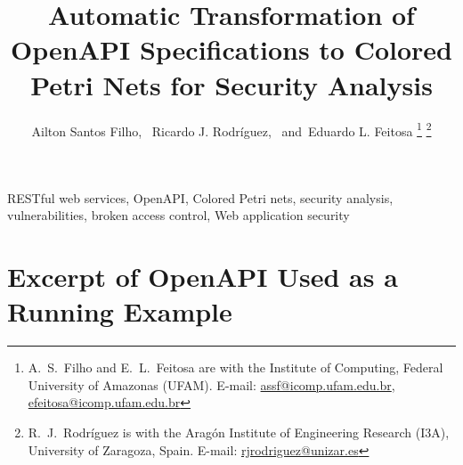 \documentclass[11pt,journal,draftcls,onecolumn]{IEEEtran}
\makeatletter
\def\markboth#1#2{\def\leftmark{\@IEEEcompsoconly{\sffamily}\MakeUppercase{\protect#1}}%
\def\rightmark{\@IEEEcompsoconly{\sffamily}\MakeUppercase{\protect#2}}}
\newcommand{\secondAuthor}{Ricardo J. Rodr\'{i}guez}
\newcommand{\secondAuthorShort}{R.~J.~Rodr\'{i}guez}
\newcommand{\mailRJ}{rjrodriguez@unizar.es}
\newcommand{\IIIA}{Aragón Institute of Engineering Research (I3A)}
\newcommand{\UZ}{University of Zaragoza, Spain}
\newcommand{\mailTo}[1]{\url{#1}}
\newcommand{\firstAuthor}{Ailton Santos Filho}
\newcommand{\firstAuthorShort}{A.~S.~Filho}
\newcommand{\thirdAuthor}{Eduardo L. Feitosa}
\newcommand{\thirdAuthorShort}{E.~L.~Feitosa}
\newcommand{\mailAilton}{assf@icomp.ufam.edu.br}
\newcommand{\mailEduardo}{efeitosa@icomp.ufam.edu.br}
\newcommand{\paperTitle}{Automatic Transformation of OpenAPI Specifications to Colored Petri Nets for Security Analysis}
\newcommand{\keywordsList}{RESTful web services, OpenAPI, Colored Petri nets, security analysis, vulnerabilities, broken access control, Web application security}
\newcommand{\ackText}{The research of Ricardo J. Rodríguez was supported by the grant TED2021-131115A-I00 funded by MCIN/AEI/ 10.13039/501100011033 and by European Union NextGenerationEU/PRTR, and by the University, Industry and Innovation Department of the Aragonese Government under {\em Programa de Proyectos Estratégicos de Grupos de Investigación} (DisCo research group, ref. T21-20R).}
\makeatother
\begin{document}
\title{\paperTitle}

\author{\firstAuthor, %
~\secondAuthor,%
~and~\thirdAuthor
\thanks{{\firstAuthorShort} and {\thirdAuthorShort} are with the Institute of Computing, Federal University of Amazonas (UFAM). E-mail: {\mailTo{\mailAilton}, \mailTo{\mailEduardo}}}
\thanks{{\secondAuthorShort} is with the {\IIIA}, {\UZ}. E-mail:
{\mailTo{\mailRJ}}}%
}


\markboth{Submitted to IEEE Transactions on Systems, Man, and Cybernetics:
Systems}{}

\maketitle







\begin{IEEEkeywords}
\keywordsList
\end{IEEEkeywords}

\IEEEpeerreviewmaketitle













%



\appendix

\section{Excerpt of OpenAPI Used as a Running Example}
\label{apx:openapi_example}




\end{document}
